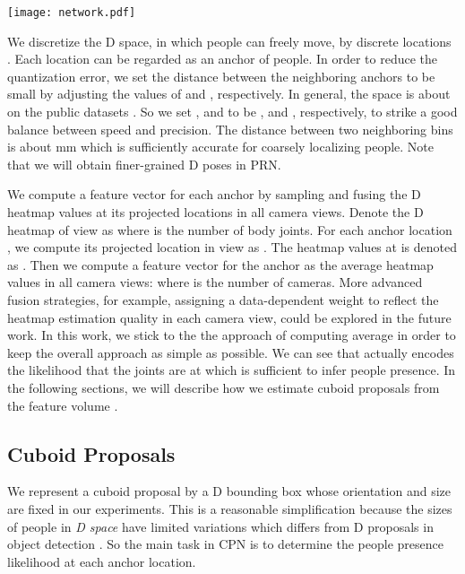 \documentclass[runningheads]{llncs}
\begin{document}
\begin{figure*}
	\centering
	\texttt{[image: network.pdf]}
	\caption{Network structure of CPN. The input is a feature volume (see section \ref{sec:featurevolume}) and the output is the probability map  (see section \ref{sec:target}). The yellow arrow represents a standard D convolutional layer and the blue arrow represents a Residual Block of two D convolutional layers as shown in the legend.
	}
	\label{fig:cpn}
\end{figure*}

We discretize the D space, in which people can freely move, by  discrete locations . Each location can be regarded as an anchor of people. In order to reduce the quantization error, we set the distance between the neighboring anchors to be small by adjusting the values of  and , respectively. In general, the space is about  on the public datasets \cite{Joo_2017_TPAMI,belagiannis20143d}. So we set ,  and  to be ,  and , respectively, to strike a good balance between speed and precision. The distance between two neighboring bins is about mm which is sufficiently accurate for coarsely localizing people. Note that we will obtain finer-grained D poses in PRN.

We compute a feature vector for each anchor by sampling and fusing the D heatmap values at its projected locations in all camera views. Denote the D heatmap of view  as  where  is the number of body joints. For each anchor location , we compute its projected location in view  as . The heatmap values at  is denoted as . Then we compute a feature vector for the anchor as the average heatmap values in all camera views:  where  is the number of cameras. More advanced fusion strategies, for example, assigning a data-dependent weight to reflect the heatmap estimation quality in each camera view, could be explored in the future work. In this work, we stick to the the approach of computing average in order to keep the overall approach as simple as possible. We can see that  actually encodes the likelihood that the  joints are at  which is sufficient to infer people presence. In the following sections, we will describe how we estimate cuboid proposals from the feature volume .

\subsection{Cuboid Proposals}
\label{sec:target}
We represent a cuboid proposal by a D bounding box whose orientation and size are fixed in our experiments. This is a reasonable simplification because the sizes of people in \emph{D space} have limited variations which differs from D proposals in object detection \cite{ren2015faster}. So the main task in CPN is to determine the people presence likelihood at each anchor location.
\end{document}
